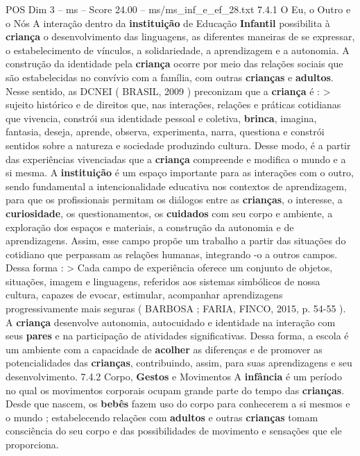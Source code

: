 \begin{textsample}{POS Dim 3 – ms – Score 24.00 – ms/ms\_inf\_e\_ef\_28.txt}  \label{ex:f3_pos_192}
7.4.1 O Eu, o Outro e o Nós A interação dentro da \textbf{instituição} de Educação \textbf{Infantil} possibilita à \textbf{criança} o desenvolvimento das linguagens, as diferentes maneiras de se expressar, o estabelecimento de vínculos, a solidariedade, a aprendizagem e a autonomia.
A construção da identidade pela \textbf{criança} ocorre por meio das relações sociais que são estabelecidas no convívio com a família, com outras \textbf{crianças} e \textbf{adultos}.
Nesse sentido, as DCNEI ( BRASIL, 2009 ) preconizam que a \textbf{criança} é : > sujeito histórico e de direitos que, nas interações, relações e práticas cotidianas que vivencia, constrói sua identidade pessoal e coletiva, \textbf{brinca}, imagina, fantasia, deseja, aprende, observa, experimenta, narra, questiona e constrói sentidos sobre a natureza e sociedade produzindo cultura.
Desse modo, é a partir das experiências vivenciadas que a \textbf{criança} compreende e modifica o mundo e a si mesma.
A \textbf{instituição} é um espaço importante para as interações com o outro, sendo fundamental a intencionalidade educativa nos contextos de aprendizagem, para que os profissionais permitam os diálogos entre as \textbf{crianças}, o interesse, a \textbf{curiosidade}, os questionamentos, os \textbf{cuidados} com seu corpo e ambiente, a exploração dos espaços e materiais, a construção da autonomia e de aprendizagens.
Assim, esse campo propõe um trabalho a partir das situações do cotidiano que perpassam as relações humanas, integrando -o a outros campos.
Dessa forma : > Cada campo de experiência oferece um conjunto de objetos, situações, imagem e linguagens, referidos aos sistemas simbólicos de nossa cultura, capazes de evocar, estimular, acompanhar aprendizagens progressivamente mais seguras ( BARBOSA ; FARIA, FINCO, 2015, p. 54-55 ).
A \textbf{criança} desenvolve autonomia, autocuidado e identidade na interação com seus \textbf{pares} e na participação de atividades significativas.
Dessa forma, a escola é um ambiente com a capacidade de \textbf{acolher} as diferenças e de promover as potencialidades das \textbf{crianças}, contribuindo, assim, para suas aprendizagens e seu desenvolvimento. 7.4.2 Corpo, \textbf{Gestos} e Movimentos A \textbf{infância} é um período no qual os movimentos corporais ocupam grande parte do tempo das \textbf{crianças}.
Desde que nascem, os \textbf{bebês} fazem uso do corpo para conhecerem a si mesmos e o mundo ; estabelecendo relações com \textbf{adultos} e outras \textbf{crianças} tomam consciência do seu corpo e das possibilidades de movimento e sensações que ele proporciona.

\end{textsample}
